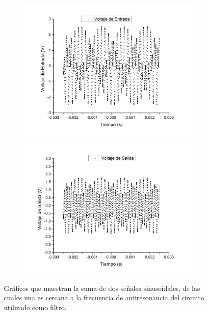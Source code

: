 \documentclass[11pt,a4paper]{article}
\begin{document}
\begin{figure}[H]
	\begin{subfigure}{0.5\textwidth}
		\includegraphics[scale=0.35]{5Khz}
		\label{subfig:5k_NFilt}
	\end{subfigure}
	\begin{subfigure}{0.5\textwidth}
		\includegraphics[scale=0.35]{5Khz_Filtrado}
		\label{subfig:5k_Filt}
	\end{subfigure}
	\caption{Gráficos que muestran la suma de dos señales sinusoidales, de las cuales una es cercana a la frecuencia de antiresonancia del circuito utilizado como filtro.}
	\label{fig:5k}
\end{figure}
\end{document}
